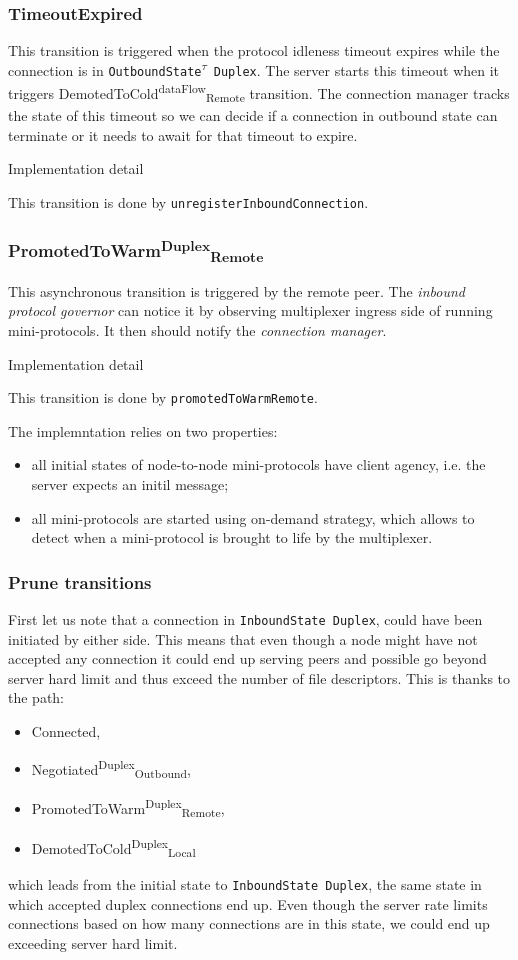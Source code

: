 \documentclass{article}
\def\InitialState{\textbullet}
\def\OutboundStateDupTau{\texttt{OutboundState\textsuperscript{$\tau$} Duplex}}
\def\InboundStateDup{\texttt{InboundState Duplex}}
\def\Connected{\textsf{Connected}}
\def\NegotiatedDupOut{\textsf{Negotiated}\textsuperscript{\textsf{Duplex}}\textsubscript{\textsf{Outbound}}}
\def\PromotedToWarmDupRem{\textsf{PromotedToWarm}\textsuperscript{\textsf{Duplex}}\textsubscript{\textsf{Remote}}}
\def\DemotedToColdDupLoc{\textsf{DemotedToCold}\textsuperscript{\textsf{Duplex}}\textsubscript{\textsf{Local}}}
\def\TimeoutExpired{\textsf{TimeoutExpired}}
\def\DemotedToColdAnyRem{\textsf{DemotedToCold}\textsuperscript{\textsf{dataFlow}}\textsubscript{\textsf{Remote}}}
\def\Prune{\textsf{Prune}}
\def\inbgov{\textit{inbound protocol governor}}
\def\connmngr{\textit{connection manager}}
\newenvironment{detail}
  {
    \begin{center}
    \begin{minipage}{0.9\textwidth}
      \begin{shaded}
      \small
      \noindent Implementation detail
      \vspace{0.3em}
      \newline
      \itshape
  }
  {
  \end{shaded}
  \end{minipage}
  \end{center}
  \vspace{1em}
  }
\begin{document}
\subsubsection{\TimeoutExpired{}}
This transition is triggered when the protocol idleness timeout expires while
the connection is in \OutboundStateDupTau{}.  The server starts this timeout
when it triggers \DemotedToColdAnyRem{} transition.  The connection manager
tracks the state of this timeout so we can decide if a connection in outbound
state can terminate or it needs to await for that timeout to expire.

\begin{detail}
  This transition is done by \texttt{unregisterInboundConnection}.
\end{detail}

\subsubsection{\PromotedToWarmDupRem{}}
This asynchronous transition is triggered by the remote peer.  The \inbgov{}
can notice it by observing multiplexer ingress side of running mini-protocols.
It then should notify the \connmngr{}.

\begin{detail}
  This transition is done by \texttt{promotedToWarmRemote}.

  The implemntation relies on two properties:
  \begin{itemize}
    \item all initial states of node-to-node mini-protocols have client agency, i.e. the server expects an initil message;
    \item all mini-protocols are started using on-demand strategy, which allows
      to detect when a mini-protocol is brought to life by the multiplexer.
  \end{itemize}
\end{detail}

\subsubsection{\Prune{} transitions}
First let us note that a connection in \InboundStateDup{}, could have been
initiated by either side.  This means that even though a node might have not
accepted any connection it could end up serving peers and possible go beyond
server hard limit and thus exceed the number of file descriptors.  This is
thanks to the path:
\begin{itemize}
  \item[] \Connected{},
  \item[] \NegotiatedDupOut{},
  \item[] \PromotedToWarmDupRem{},
  \item[] \DemotedToColdDupLoc{}
\end{itemize}
which leads from the initial state \InitialState{} to \InboundStateDup{}, the
same state in which accepted duplex connections end up.  Even though the server
rate limits connections based on how many connections are in this state, we
could end up exceeding server hard limit.
\end{document}
